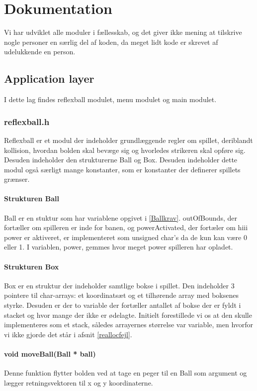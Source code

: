\section{Dokumentation}
Vi har udviklet alle moduler i fællesskab, og det giver ikke mening at tilskrive nogle personer en særlig del af koden, da meget lidt kode er skrevet af udelukkende en person. 

\subsection{Application layer}
I dette lag findes reflexball modulet, menu modulet og main modulet.
\subsubsection{reflexball.h}
Reflexball er et modul der indeholder grundlæggende regler om spillet, deriblandt kollision, hvordan bolden skal bevæge sig og hvorledes strikeren skal opføre sig. Desuden indeholder den strukturerne Ball og Box. Desuden indeholder dette modul også særligt mange konstanter, som er konstanter der definerer spillets grænser.
\paragraph{Strukturen Ball}
Ball er en stuktur som har variablene opgivet i \ref{Ballkrav}. outOfBounds, der fortæller om spilleren er inde for banen, og powerActivated, der fortæler om hiii power er aktiveret, er implementeret som unsigned char's da de kun kan være 0 eller 1. I variablen, power, gemmes hvor meget power spilleren har opladet.
 

\paragraph{Strukturen Box}
Box er en struktur der indeholder samtlige bokse i spillet. Den indeholder 3 pointere til char-arrays: et koordinatsæt og et tilhørende array med boksenes styrke. Desuden er der to variable der fortæller antallet af bokse der er fyldt i stacket og hvor mange der ikke er ødelagte. Initielt forestillede vi os at den skulle implementeres som et stack, således arrayernes størrelse var variable, men hvorfor vi ikke gjorde det står i afsnit \ref{reallocfejl}.
\paragraph{void moveBall(Ball * ball)}
Denne funktion flytter bolden ved at tage en peger til en Ball som argument og lægger retningsvektoren til x og y koordinaterne.
